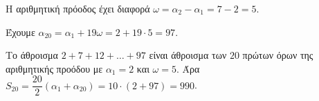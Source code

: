 
\begin{alist}
\item Η αριθμητική πρόοδος έχει διαφορά $\omega = \alpha_2 - \alpha_1 = 7 - 2 = 5$.

\item Έχουμε $\alpha_{20} = \alpha_1 + 19\omega = 2 + 19 \cdot 5 = 97$.

\item Το άθροισμα $2 + 7 + 12 + \dots + 97$ είναι άθροισμα των $20$ πρώτων όρων της 
αριθμητικής προόδου με $\alpha_1 = 2$ και $\omega = 5$.
Άρα $S_{20} = \dfrac{20}{2} (\alpha_1 + \alpha_{20}) = 10 \cdot (2 + 97) = 990$.
\end{alist}

